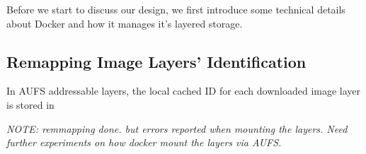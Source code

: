 

    
 


Before we start to discuss our design, we first introduce some technical details about Docker and how it manages it's layered storage.




 
\subsection{Remapping Image Layers' Identification}

In AUFS addressable layers, the local cached ID for each downloaded image layer is stored in 

\textit{NOTE: remmapping done. but errors reported when mounting the layers. Need further experiments on how docker mount the layers via AUFS.}

